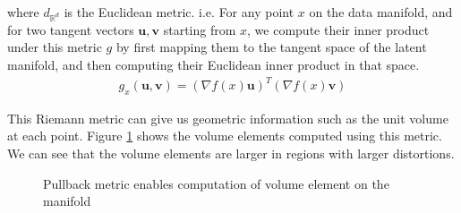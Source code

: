 \documentclass{article}
\theoremstyle{plain}
\theoremstyle{definition}
\theoremstyle{remark}
\begin{document}
where $d_{\mathbb R^d}$ is the Euclidean metric. i.e. For any point $x$ on the data manifold, and for two tangent vectors $\mathbf u,\mathbf v$ starting from $x$, we compute their inner product under this metric $g$ by first mapping them to the tangent space of the latent manifold, and then computing their Euclidean inner product in that space.
\begin{align}
    g_x(\mathbf u,\mathbf v)=(\nabla f(x)\mathbf u)^T(\nabla f(x)\mathbf v)
\end{align}
\par This Riemann metric can give us geometric information such as the unit volume at each point. Figure \ref{fig:vol} shows the volume elements computed using this metric. We can see that the volume elements are larger in regions with larger distortions.
\begin{figure}[htbp]
    \centering
    \caption{Pullback metric enables computation of volume element on the manifold}
    \label{fig:vol}
\end{figure}
\end{document}
